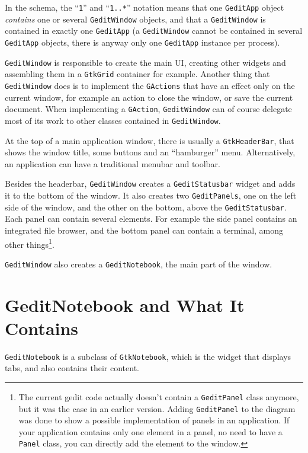 In the schema, the ``\texttt{1}'' and ``\texttt{1..*}'' notation means that one \lstinline{GeditApp} object \emph{contains} one or several \lstinline{GeditWindow} objects, and that a \lstinline{GeditWindow} is contained in exactly one \lstinline{GeditApp} (a \lstinline{GeditWindow} cannot be contained in several \lstinline{GeditApp} objects, there is anyway only one \lstinline{GeditApp} instance per process).

\lstinline{GeditWindow} is responsible to create the main UI, creating other widgets and assembling them in a \lstinline{GtkGrid} container for example. Another thing that \lstinline{GeditWindow} does is to implement the \lstinline{GActions} that have an effect only on the current window, for example an action to close the window, or save the current document. When implementing a \lstinline{GAction}, \lstinline{GeditWindow} can of course delegate most of its work to other classes contained in \lstinline{GeditWindow}.

At the top of a main application window, there is usually a \lstinline{GtkHeaderBar}, that shows the window title, some buttons and an ``hamburger'' menu. Alternatively, an application can have a traditional menubar and toolbar.

Besides the headerbar, \lstinline{GeditWindow} creates a \lstinline{GeditStatusbar} widget and adds it to the bottom of the window. It also creates two \lstinline{GeditPanels}, one on the left side of the window, and the other on the bottom, above the \lstinline{GeditStatusbar}. Each panel can contain several elements. For example the side panel contains an integrated file browser, and the bottom panel can contain a terminal, among other things\footnote{The current gedit code actually doesn't contain a \lstinline{GeditPanel} class anymore, but it was the case in an earlier version. Adding \lstinline{GeditPanel} to the diagram was done to show a possible implementation of panels in an application. If your application contains only one element in a panel, no need to have a \lstinline{Panel} class, you can directly add the element to the window.}.

\lstinline{GeditWindow} also creates a \lstinline{GeditNotebook}, the main part of the window.

\section{GeditNotebook and What It Contains}

\lstinline{GeditNotebook} is a subclass of \lstinline{GtkNotebook}, which is the widget that displays tabs, and also contains their content.

